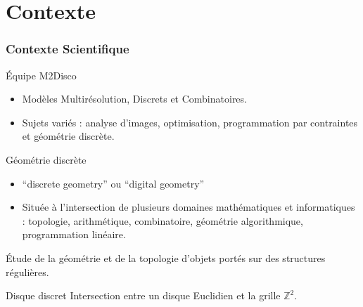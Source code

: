 \section{Contexte}

\begin{frame}
\frametitle{Contexte Scientifique}
\begin{block}{Équipe M2Disco}
  \begin{itemize}
    \item Modèles Multirésolution, Discrets et Combinatoires.
    \item Sujets variés : analyse d'images, optimisation, programmation par contraintes et \alert{géométrie discrète}.
  \end{itemize}
\end{block}   

\begin{block}{Géométrie discrète}
  \begin{itemize}
    \item ``discrete geometry'' ou ``digital geometry''
    \item Située à l'intersection de plusieurs domaines mathématiques et informatiques : topologie, arithmétique, combinatoire, géométrie algorithmique, programmation linéaire. \\
  \end{itemize} 
  Étude de la géométrie et de la topologie d'objets portés sur des structures régulières.\\ 
\end{block}   

\begin{alertblock}{Disque discret}
  Intersection entre un disque Euclidien et la grille $\mathbb{Z}^{2}$. 
\end{alertblock}
\end{frame}

